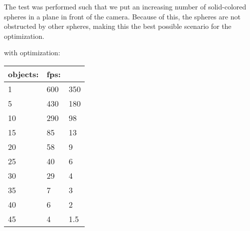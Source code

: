 			The test was performed such that we put an increasing number of solid-colored spheres in a 
			plane in front of the camera. Because of this, the spheres are not obstructed
			by other spheres, making this the best possible scenario for the optimization.

			with optimization:

			\begin{tabular}{lll}
				objects: & fps:	\\ \hline 
				1	& 600 & 350	\\ 
				5	& 430 & 180	\\			
				10	& 290 & 98	\\
				15	& 85 & 13	\\
				20	& 58 & 9	\\
				25	& 40 & 6	\\
				30	& 29 & 4	\\
				35	& 7 & 3		\\
				40	& 6 & 2		\\
				45	& 4	& 1.5	\\
			\end{tabular}



		
		
		

